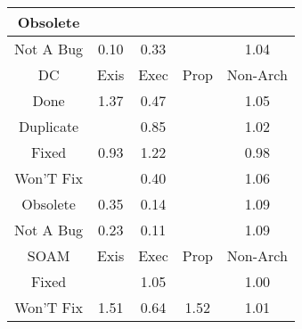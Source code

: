 \begin{tabular}{|c||c|c|c|c|}
\hline
Obsolete &  &  &  &  \\ 
\hline
Not A Bug & \cellcolor[rgb]{0.76,0.13,0.28} 0.10 & \cellcolor[rgb]{0.7988512128099503,0.31389574063376435,0.31626113195595357} 0.33 &  & \cellcolor[rgb]{0.9013964042522189,0.8359246125405246,0.42} 1.04 \\ 
\hline
\hline
DC & Exis & Exec & Prop & Non-Arch \\ 
\hline
Done & \cellcolor[rgb]{0.8213464525965803,0.7980062143878538,0.42} 1.37 & \cellcolor[rgb]{0.821342581854049,0.4203548874424986,0.33725307639711244} 0.47 &  & \cellcolor[rgb]{0.8980512829072453,0.8343400813771161,0.42} 1.05 \\ 
\hline
Duplicate &  & \cellcolor[rgb]{0.8846174193261099,0.7198557848102533,0.39630959137103583} 0.85 &  & \cellcolor[rgb]{0.9061988361856893,0.8381994487195369,0.42} 1.02 \\ 
\hline
Fixed & \cellcolor[rgb]{0.898415610661722,0.7851672237988176,0.4091879032842739} 0.93 & \cellcolor[rgb]{0.8573671504120375,0.8150686501951756,0.42} 1.22 &  & \cellcolor[rgb]{0.9064308704578526,0.8231061201671692,0.4166688124273291} 0.98 \\ 
\hline
Won'T Fix &  & \cellcolor[rgb]{0.8096262783705169,0.36489771762044665,0.32631785981248246} 0.40 &  & \cellcolor[rgb]{0.8960665293806326,0.8333999349697734,0.42} 1.06 \\ 
\hline
Obsolete & \cellcolor[rgb]{0.8018518119885447,0.3280985767457788,0.3190616911893085} 0.35 & \cellcolor[rgb]{0.7670812697405953,0.1635180101054846,0.2866091850912223} 0.14 &  & \cellcolor[rgb]{0.8889536500534795,0.8300306763411218,0.42} 1.09 \\ 
\hline
Not A Bug & \cellcolor[rgb]{0.7823354612578112,0.23572118328697295,0.30084643050729043} 0.23 & \cellcolor[rgb]{0.7621325571321216,0.14009410375870873,0.28199038665664683} 0.11 &  & \cellcolor[rgb]{0.887983146554296,0.829570964157298,0.42} 1.09 \\ 
\hline
\hline
SOAM & Exis & Exec & Prop & Non-Arch \\ 
\hline
Fixed &  & \cellcolor[rgb]{0.8982746269391613,0.8344458759185501,0.42} 1.05 &  & \cellcolor[rgb]{0.9095038383324753,0.8376515014403827,0.4195369157769769} 1.00 \\ 
\hline
Won'T Fix & \cellcolor[rgb]{0.7888109118328467,0.782594642447138,0.42000000000000004} 1.51 & \cellcolor[rgb]{0.8503460564907921,0.557638000723082,0.36432298605807256} 0.64 & \cellcolor[rgb]{0.786259396342245,0.7813860298463265,0.42} 1.52 & \cellcolor[rgb]{0.9070788571402961,0.8386163007506665,0.42} 1.01 \\ 

\end{tabular}
